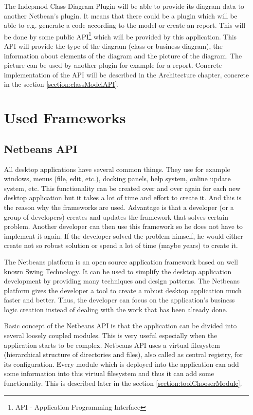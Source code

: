 The Indepmod Class Diagram Plugin will be able to provide its diagram data to another Netbean's plugin. It means that there could be a plugin which will be able to e.g. generate a code according to the model or create an report. This will be done by some public API\footnote{API - Application Programming Interface} which will be provided by this application. This API will provide the type of the diagram (class or business diagram), the information about elements of the diagram and the picture of the diagram. The picture can be used by another plugin for example for a report. Concrete implementation of the API will be described in the Architecture chapter, concrete in the section \ref{section:classModelAPI}.

\section{Used Frameworks}

\subsection{Netbeans API}
\label{section:netbeansAPI}

All desktop applications have several common things. They use for example windows, menus (file, edit, etc.), docking panels, help system, online update system, etc. This functionality can be created over and over again for each new desktop application but it takes a lot of time and effort to create it. And this is the reason why the frameworks are used. Advantage is that a developer (or a group of developers) creates and updates the framework that solves certain problem. Another developer can then use this framework so he does not have to implement it again. If the developer solved the problem himself, he would either create not so robust solution or spend a lot of time (maybe years) to create it.

The Netbeans platform is an open source application framework based on well known Swing Technology. It can be used to simplify the desktop application development by providing many techniques and design patterns. The Netbeans platform gives the developer a tool to create a robust desktop application much faster and better. Thus, the developer can focus on the application's business logic creation instead of dealing with the work that has been already done.

Basic concept of the Netbeans API is that the application can be divided into several loosely coupled modules. This is very useful especially when the application starts to be complex. Netbeans API uses a virtual filesystem (hierarchical structure of directories and files), also called as central registry, for its configuration. Every module which is deployed into the application can add some information into this virtual filesystem and thus it can add some functionality. This is described later in the section \ref{section:toolChooserModule}.



